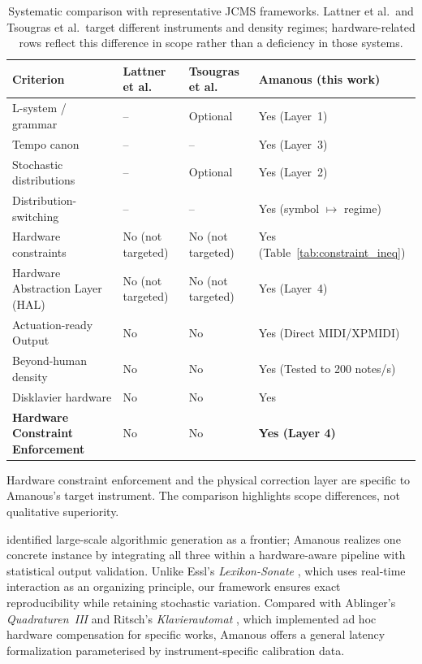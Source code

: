 \documentclass[a4paper]{article}
\newcommand{\tbl}[2]{\caption{#1}\centering#2}
\newcommand{\tabnote}[1]{\par\vspace{0.5ex}\footnotesize#1}
\theoremstyle{definition}
\theoremstyle{remark}
\begin{document}
\begin{table}[htbp]
\tbl{Systematic comparison with representative JCMS frameworks. Lattner et al.\ and Tsougras et al.\ target different instruments and density regimes; hardware-related rows reflect this difference in scope rather than a deficiency in those systems.}
{\begin{tabular}{@{}p{2.2cm}p{2.8cm}p{2.8cm}p{3.2cm}@{}} \toprule
\textbf{Criterion} & \textbf{Lattner et al.} & \textbf{Tsougras et al.} & \textbf{Amanous (this work)} \\ \midrule
L-system / grammar & -- & Optional & Yes (Layer~1) \\
Tempo canon & -- & -- & Yes (Layer~3) \\
Stochastic distributions & -- & Optional & Yes (Layer~2) \\
Distribution-switching & -- & -- & Yes (symbol $\mapsto$ regime) \\
Hardware constraints & No (not targeted) & No (not targeted) & Yes (Table~\ref{tab:constraint_ineq}) \\
Hardware Abstraction Layer (HAL) & No (not targeted) & No (not targeted) & Yes (Layer~4) \\
Actuation-ready Output & No & No & Yes (Direct MIDI/XPMIDI) \\
Beyond-human density & No & No & Yes (Tested to 200 notes/s) \\
Disklavier hardware & No & No & Yes \\ 
\textbf{Hardware Constraint Enforcement} & No & No & \textbf{Yes (Layer 4)} \\ \bottomrule
\end{tabular}}
\tabnote{Hardware constraint enforcement and the physical correction layer are specific to Amanous's target instrument. The comparison highlights scope differences, not qualitative superiority.}
\label{tab:systematic_comparison}
\end{table}

\citet{collins2018there} identified large-scale algorithmic generation as a frontier; Amanous realizes one concrete instance by integrating all three within a hardware-aware pipeline with statistical output validation. Unlike Essl's \emph{Lexikon-Sonate} \citep{collins2017cambridge}, which uses real-time interaction as an organizing principle, our framework ensures exact reproducibility while retaining stochastic variation. Compared with Ablinger's \emph{Quadraturen~III} \citep{ablinger2004quadraturen} and Ritsch's \emph{Klavierautomat} \citep{ritsch2011robotic}, which implemented ad hoc hardware compensation for specific works, Amanous offers a general latency formalization parameterised by instrument-specific calibration data.
\end{document}
